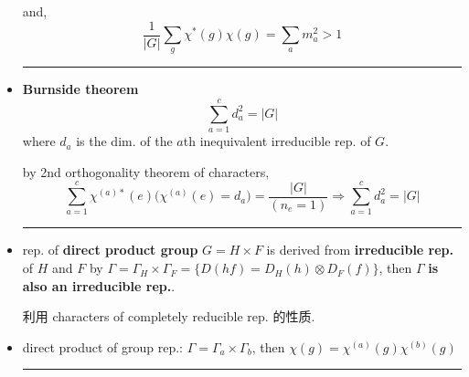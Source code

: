 \begin{itemize}
	and,
	\begin{equation}
		\frac{1}{|G|} \sum_g \chi^*(g) \chi(g) = \sum_a m_a^2 > 1
	\end{equation}
	
	\noindent\rule[0.5ex]{\linewidth}{0.5pt} %
	
	\item \textbf{Burnside theorem}
	\begin{equation}
		\sum_{a = 1}^c d_a^2 = |G|
	\end{equation}
	where $d_a$ is the dim. of the $a$th inequivalent irreducible rep. of $G$.
	
	\begin{tcolorbox}[title=proof:]
		by 2nd orthogonality theorem of characters,
		\begin{equation}
			\sum_{a = 1}^c \chi^{(a) *}(e) \big( \chi^{(a)}(e) = d_a \big) = \frac{|G|}{(n_e = 1)} \Longrightarrow \sum_{a = 1}^c d_a^2 = |G|
		\end{equation}
	\end{tcolorbox}
	
	\noindent\rule[0.5ex]{\linewidth}{0.5pt} %
	
	\item rep. of \textbf{direct product group} $G = H \times F$ is derived from \textbf{irreducible rep.} of $H$ and $F$ by $\Gamma = \Gamma_H \times \Gamma_F = \{D(hf) = D_H(h) \otimes D_F(f)\}$, then $\Gamma$ \textbf{is also an irreducible rep.}.
	
	\begin{tcolorbox}[title=proof:]
		利用 characters of completely reducible rep. 的性质.
	\end{tcolorbox}
	
	\item direct product of group rep.: $\Gamma = \Gamma_a \times \Gamma_b$, then $\chi(g) = \chi^{(a)}(g) \chi^{(b)}(g)$
	
	\noindent\rule[0.5ex]{\linewidth}{0.5pt} %
	

\end{itemize}
